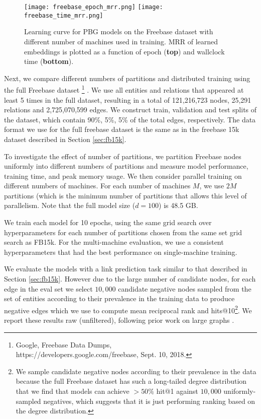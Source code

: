 \documentclass{article}
\begin{document}
\begin{figure*}[h!]
\centering
    \texttt{[image: freebase\_epoch\_mrr.png]}
    \texttt{[image: freebase\_time\_mrr.png]}
    \vspace{-3mm}
    \caption{Learning curve for PBG models on the Freebase dataset with different number of machines used in training. MRR of learned embeddings is plotted as a function of epoch (\textbf{top}) and wallclock time (\textbf{bottom}).}
    \vspace{-3mm}
    \label{fig:freebase}
\end{figure*}

\label{sec:fbfull}
Next, we compare different numbers of partitions and distributed training using the full Freebase dataset \footnote{Google, Freebase Data Dumps, \\ https://developers.google.com/freebase, Sept. 10, 2018.} \cite{freebase:datadumps}. We use all entities and relations that appeared at least 5 times in the full dataset, resulting in a total of 121,216,723 nodes, 25,291 relations and 2,725,070,599 edges. We construct train, validation and test splits of the dataset, which contain 90\%, 5\%, 5\% of the total edges, respectively. The data format we use for the full freebase dataset is the same as in the freebase 15k dataset described in Section \ref{sec:fb15k}.

To investigate the effect of number of partitions, we partition Freebase nodes uniformly into different numbers of partitions and measure model performance, training time, and peak memory usage.  We then consider parallel training on different numbers of machines. For each number of machines $M$, we use $2M$ partitions (which is the minimum number of partitions that allows this level of parallelism. Note that the full model size ($d=100$) is 48.5 GB.

We train each model for 10 epochs, using the same grid search over hyperparameters for each number of partitions chosen from the same set grid search as FB15k. For the multi-machine evaluation, we use a consistent hyperparameters that had the best performance on single-machine training.

We evaluate the models with a link prediction task similar to that described in Section \ref{sec:fb15k}. However due to the large number of candidate nodes, for each edge in the eval set we select $10,000$ candidate negative nodes sampled from the set of entities according to their prevalence in the training data to produce negative edges which we use to compute mean reciprocal rank and hits@10\footnote{We sample candidate negative nodes according to their prevalence in the data because the full Freebase dataset has such a long-tailed degree distribution that we find that models can achieve $>50\%$ hit@1 against $10,000$ uniformly-sampled negatives, which suggests that it is just performing ranking based on the degree distribution.}.
We report these results raw (unfiltered), following prior work on large graphs \cite{transE}. 
\end{document}
